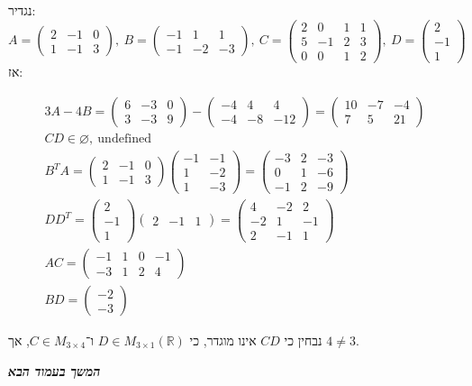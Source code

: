 \documentclass[]{article}
\newcommand\sen   {\begin{otherlanguage}{english}}
\newcommand\she   {\end{otherlanguage}}
\newcommand\npage {\vfil {\hfil \textbf{\textit{המשך בעמוד הבא}}} \hfil \vfil \pagebreak}
\newcommand\R     {\mathbb{R}}
\newcommand\pms[1]    {\begin{pmatrix}
        #1
\end{pmatrix}}
\theoremstyle{definition}
\begin{document}
    \section{}
    נגדיר: 
    \[ A = \pms{2 & -1 & 0 \\ 1 & -1 & 3}, \ B = \pms{-1 & 1 & 1 \\ -1 & -2 & -3}, \ C = \pms{2 & 0 & 1 & 1 \\ 5 & -1 & 2 & 3 \\ 0 & 0 & 1 & 2}, \ D = \pms{2 \\ -1 \\ 1} \]
    אז: 
    \sen\begin{gather}
        3A - 4B = \pms{6 & -3 & 0 \\ 3 & -3 & 9}
        - \pms{-4 & 4 & 4 \\ -4 & -8 & -12}
        = \pms{10 & -7 & -4 \\  7 & 5 & 21} \\
        CD \in \varnothing, \  \mathrm{undefined} \\
        B^T A = \pms{
            2 & -1 & 0 \\ 
            1 & -1 & 3
        } \pms{
            -1 & -1 \\ 
            1 & -2 \\ 
            1 & -3
        } = \pms{
            -3 & 2 & -3 \\ 
            0 & 1 & -6 \\ 
            -1 & 2 & -9
        } \\
        D D^T = \pms{2 \\ -1 \\ 1}\pms{2 & -1 & 1}
        = \pms{
            4 & -2 & 2 \\ 
            -2 & 1 & -1 \\ 
            2 & -1 & 1
        } \\ 
        AC = \pms{
            -1 & 1 & 0 & -1 \\ 
            -3 & 1 & 2 & 4
        } \\
        BD = \pms{-2 \\ -3}
    \end{gather}\she
    
    נבחין כי $CD$ אינו מוגדר, כי $D \in M_{3 \times 1}(\R)$ ו־$C \in M_{3 \times 4}$, אך $4 \neq 3$. 
    
    \npage
    
\end{document}
